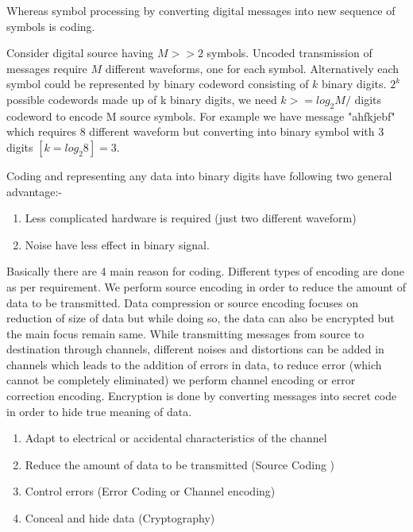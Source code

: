 \documentclass[10pt,a4paper]{article}
\begin{document}
	Whereas symbol processing  by converting digital messages into new sequence of symbols is coding. 
	
	Consider digital source having $ M >> 2 $ symbols. Uncoded transmission of messages require $ M $ different waveforms, one for each symbol. Alternatively each symbol could be represented by binary codeword consisting of $ k $ binary digits. $2^k$ possible codewords made up of k binary digits, we need $k>= log_2 M /$ digits codeword to encode M source symbols. For example we have message "ahfkjebf" which requires 8 different waveform but converting into binary symbol with 3 digits $ [ k = log_2 8] = 3$. 
	
	Coding and representing any data into binary digits have following two general advantage:- 
	\begin{enumerate}
		\item 	Less complicated hardware is required (just two different waveform) 
		\item  Noise have less effect in binary signal.  
	\end{enumerate}

	Basically there are 4 main reason for coding. Different types of encoding are done as per requirement. We perform source encoding in order to reduce the amount of data to be transmitted. Data compression or source encoding focuses on reduction of size of data but while doing so, the data can also be encrypted but the main focus remain same. 
	\newline
	\newline
	While transmitting messages from source to destination through channels, different noises and distortions can be added in channels which leads to the addition of errors in data, to reduce error (which cannot be completely eliminated) we perform channel encoding or error correction encoding. 
	\newline
	\newline
	Encryption is done by converting messages into secret code in order to hide true meaning of data. 
	
	\begin{enumerate}
		\item Adapt to electrical or accidental characteristics of the channel   
		\item Reduce the amount of data to be transmitted (Source Coding )
		\item Control errors (Error Coding or Channel encoding)
		\item Conceal and hide data (Cryptography)
	\end{enumerate}
	 
\end{document}
